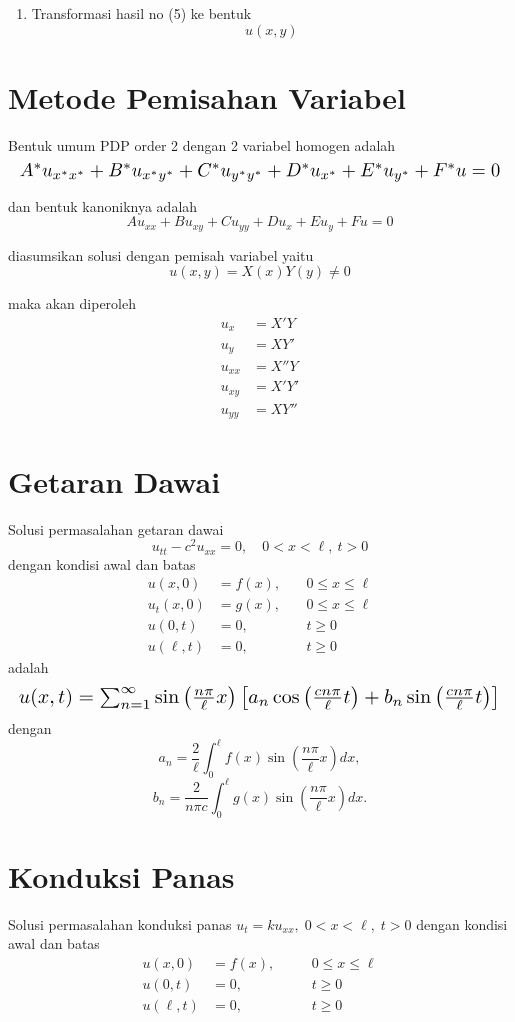 \documentclass[a4paper,extrafontsizes, 9pt]{memoir}
\begin{document}
\begin{multicols}{3}
\begin{enumerate}
    \item Transformasi hasil no (5) ke bentuk
    \[
    u(x, y)
    \]
\end{enumerate}
\section*{\small Metode Pemisahan Variabel}
Bentuk umum PDP order 2 dengan 2 variabel homogen adalah
\[
\resizebox{\linewidth}{!}{$
A^* u_{x^*x^*} + B^* u_{x^*y^*} + C^* u_{y^*y^*} + D^* u_{x^*} + E^* u_{y^*} + F^* u = 0
$}
\]

dan bentuk kanoniknya adalah
\[
A u_{xx} + B u_{xy} + C u_{yy} + D u_x + E u_y + F u = 0
\]

diasumsikan solusi dengan pemisah variabel yaitu
\[
u(x,y) = X(x) Y(y) \ne 0
\]

maka akan diperoleh
\[
\begin{aligned}
u_x &= X' Y \\
u_y &= X Y' \\
u_{xx} &= X'' Y \\
u_{xy} &= X' Y' \\
u_{yy} &= X Y''
\end{aligned}
\]

    \section*{\small Getaran Dawai}
           Solusi permasalahan getaran dawai 
\[
u_{tt} - c^2 u_{xx} = 0, \quad 0 < x < \ell, \ t > 0
\]
dengan kondisi awal dan batas
\[
\begin{aligned}
u(x,0) &= f(x), &\quad 0 \leq x \leq \ell \\
u_t(x,0) &= g(x), &\quad 0 \leq x \leq \ell \\
u(0,t) &= 0, &\quad t \geq 0 \\
u(\ell,t) &= 0, &\quad t \geq 0
\end{aligned}
\]
adalah
\[
\resizebox{\linewidth}{!}{$
u(x,t) = \sum_{n=1}^{\infty} \sin\left( \frac{n\pi}{\ell} x \right)
\left[ a_n \cos\left( \frac{cn\pi}{\ell} t \right) + b_n \sin\left( \frac{cn\pi}{\ell} t \right) \right]
$}
\]
dengan
\[
a_n = \frac{2}{\ell} \int_0^{\ell} f(x) \sin\left( \frac{n\pi}{\ell} x \right) dx,
\]
\[
b_n = \frac{2}{n\pi c} \int_0^{\ell} g(x) \sin\left( \frac{n\pi}{\ell} x \right) dx.
\]

    \section*{\small Konduksi Panas}
Solusi permasalahan konduksi panas \( u_t = ku_{xx}, \; 0 < x < \ell, \; t > 0 \) dengan kondisi awal dan batas
\[
\begin{aligned}
u(x,0) &= f(x), \quad &&0 \leq x \leq \ell \\
u(0,t) &= 0, \quad &&t \geq 0 \\
u(\ell,t) &= 0, \quad &&t \geq 0
\end{aligned}
\]


\end{multicols}
\end{document}
